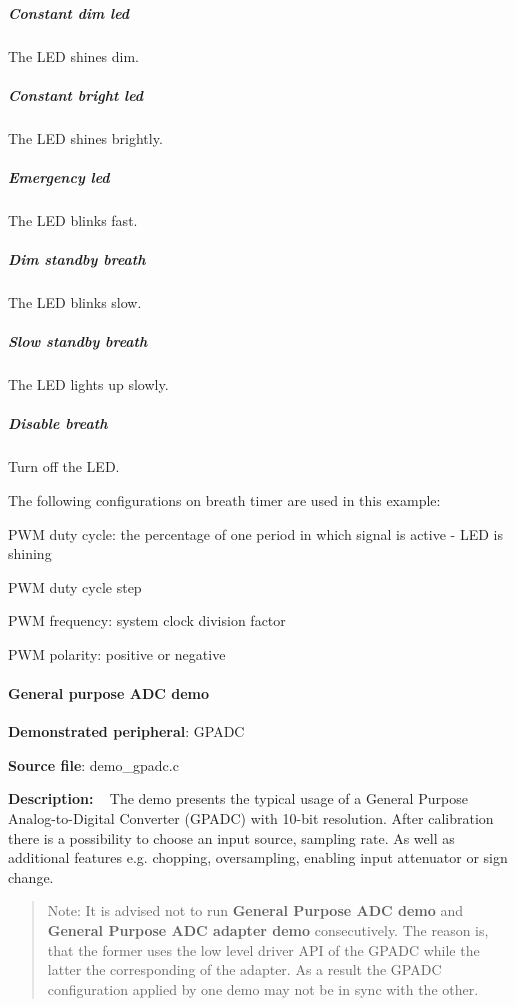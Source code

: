\subparagraph*{Constant dim led}

The L\+E\+D shines dim.

\subparagraph*{Constant bright led}

The L\+E\+D shines brightly.

\subparagraph*{Emergency led}

The L\+E\+D blinks fast.

\subparagraph*{Dim standby breath}

The L\+E\+D blinks slow.

\subparagraph*{Slow standby breath}

The L\+E\+D lights up slowly.

\subparagraph*{Disable breath}

Turn off the L\+E\+D.

The following configurations on breath timer are used in this example\+:
\begin{DoxyItemize}
\item P\+W\+M duty cycle\+: the percentage of one period in which signal is active -\/ L\+E\+D is shining
\item P\+W\+M duty cycle step
\item P\+W\+M frequency\+: system clock division factor
\item P\+W\+M polarity\+: positive or negative
\end{DoxyItemize}

\paragraph*{General purpose A\+D\+C demo}


\begin{DoxyItemize}
\item {\bfseries Demonstrated peripheral}\+: G\+P\+A\+D\+C
\item {\bfseries Source file}\+: demo\+\_\+gpadc.\+c
\item {\bfseries Description\+:} ~\newline
 The demo presents the typical usage of a General Purpose Analog-\/to-\/\+Digital Converter (G\+P\+A\+D\+C) with 10-\/bit resolution. After calibration there is a possibility to choose an input source, sampling rate. As well as additional features e.\+g. chopping, oversampling, enabling input attenuator or sign change.
\end{DoxyItemize}

\begin{quote}
Note\+: It is advised not to run {\bfseries General Purpose A\+D\+C demo} and {\bfseries General Purpose A\+D\+C adapter demo} consecutively. The reason is, that the former uses the low level driver A\+P\+I of the G\+P\+A\+D\+C while the latter the corresponding of the adapter. As a result the G\+P\+A\+D\+C configuration applied by one demo may not be in sync with the other. \end{quote}



